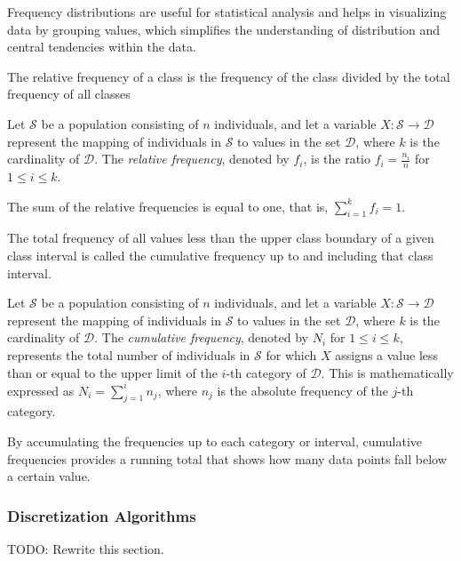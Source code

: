 Frequency distributions are useful for statistical analysis and helps in visualizing data by grouping values, which simplifies the understanding of distribution and central tendencies within the data.

The relative frequency of a class is the frequency of the class divided by the total frequency of all classes

\begin{definition}
Let $\mathcal{S}$ be a population consisting of $n$ individuals, and let a variable $X: \mathcal{S} \rightarrow \mathcal{D}$ represent the mapping of individuals in $\mathcal{S}$ to values in the set $\mathcal{D}$, where $k$ is the cardinality of $\mathcal{D}$. The \emph{relative frequency}, denoted by $f_i$, is the ratio $f_i = \frac{n_i}{n}$ for $1 \leq i \leq k$.
\end{definition}

The sum of the relative frequencies is equal to one, that is, $\sum_{i=1}^k f_i = 1$.

The total frequency of all values less than the upper class boundary of a given class interval is called the cumulative frequency up to and including that class interval.

\begin{definition}
Let $\mathcal{S}$ be a population consisting of $n$ individuals, and let a variable $X: \mathcal{S} \rightarrow \mathcal{D}$ represent the mapping of individuals in $\mathcal{S}$ to values in the set $\mathcal{D}$, where $k$ is the cardinality of $\mathcal{D}$. The \emph{cumulative frequency}, denoted by $N_i$ for $1 \leq i \leq k$, represents the total number of individuals in $\mathcal{S}$ for which $X$ assigns a value less than or equal to the upper limit of the $i$-th category of $\mathcal{D}$. This is mathematically expressed as $N_i = \sum_{j=1}^i n_j$, where $n_j$ is the absolute frequency of the $j$-th category.
\end{definition}

By accumulating the frequencies up to each category or interval, cumulative frequencies provides a running total that shows how many data points fall below a certain value.

\subsubsection*{Discretization Algorithms}

{\color{red} TODO: Rewrite this section.}

